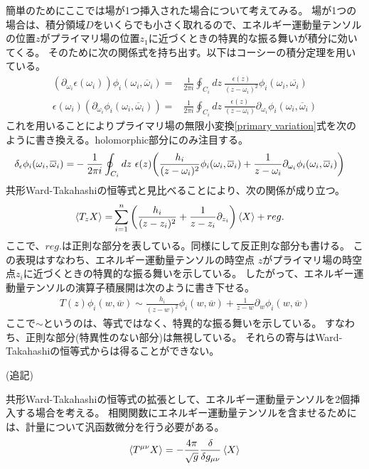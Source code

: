 \documentclass[11pt, dvipdfmx]{article}
\numberwithin{equation}{section}
\newcommand{\blankline}{\par\vspace{\baselineskip}} %
\begin{document}
簡単のためにここでは場が1つ挿入された場合について考えてみる。
場が1つの場合は、積分領域$D$をいくらでも小さく取れるので、エネルギー運動量テンソルの位置$z$がプライマリ場の位置$z_1$に近づくときの特異的な振る舞いが積分に効いてくる。
そのために次の関係式を持ち出す。以下はコーシーの積分定理を用いている。
\begin{align}
    (\partial_{\omega_i}\epsilon(\omega_i))\phi_i(\omega_i,\overline{\omega}_i)=&\frac{1}{2\pi i}\oint_{C_i} dz \ \frac{\epsilon(z)}{(z-\omega_i)^2}\phi_i(\omega_i,\overline{\omega_i})\\
\epsilon(\omega_i)(\partial_{\omega_i}\phi_i(\omega_i,\overline{\omega}_i))=&\frac{1}{2\pi i}\oint_{C_i} dz \ \frac{\epsilon(z)}{(z-\omega_i)}\partial_{\omega_i}\phi_i(\omega_i,\overline{\omega}_i)
\end{align}
これを用いることによりプライマリ場の無限小変換\eqref{primary variation}式を次のように書き換える。holomorphic部分にのみ注目する。
\begin{align}
    \delta_{\epsilon}\phi_i(\omega_i,\overline{\omega}_i)=&-\frac{1}{2\pi i}\oint_{C_i} dz \ \epsilon(z)\qty(\frac{h_i}{(z-\omega_i)^2}\phi_i(\omega_i,\overline{\omega}_i)+\frac{1}{z-\omega_i}\partial_{\omega_i}\phi_i(\omega_i,\overline{\omega}_i))
\end{align}
共形Ward-Takahashiの恒等式と見比べることにより、次の関係が成り立つ。
\begin{align}
\ev{T_z X}=&\sum_{i=1}^n \qty(\frac{h_i}{(z-z_i)^2}+\frac{1}{z-z_i}\partial_{z_i})\ev{X}+reg.
\end{align}
ここで、$reg.$は正則な部分を表している。同様にして反正則な部分も書ける。
この表現はすなわち、エネルギー運動量テンソルの時空点
$z$がプライマリ場の時空点$z_i$に近づくときの特異的な振る舞いを示している。
したがって、エネルギー運動量テンソルの演算子積展開は次のように書き下せる。
\begin{align}
    T(z)\phi_i(w,\overline{w})\sim \frac{h_i}{(z-w)^2}\phi_i(w,\overline{w})+\frac{1}{z-w}\partial_w \phi_i(w,\overline{w})\label{OPE of T and phi }
\end{align}
ここで$\sim$というのは、等式ではなく、特異的な振る舞いを示している。
すなわち、正則な部分(特異性のない部分)は無視している。
それらの寄与はWard-Takahashiの恒等式からは得ることができない。
\blankline
(追記)
\blankline
共形Ward-Takahashiの恒等式の拡張として、エネルギー運動量テンソルを2個挿入する場合を考える。
相関関数にエネルギー運動量テンソルを含ませるためには、計量について汎函数微分を行う必要がある。
\begin{align}
    \ev{T^{\mu\nu}X}=-\frac{4\pi}{\sqrt{g}}\frac{\delta}{\delta g_{\mu\nu}}\ev{X}
\end{align}
\end{document}
